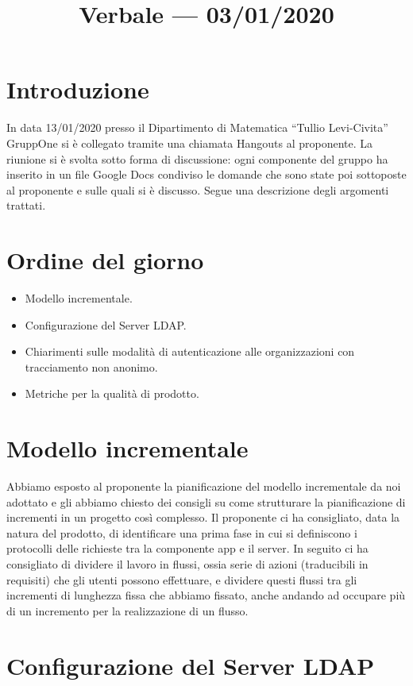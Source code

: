 \documentclass{article}
\title{Verbale --- 03/01/2020}
\begin{document}


\section{Introduzione}%
\label{sec:introduzione}

In data 13/01/2020 presso il Dipartimento di Matematica ``Tullio Levi-Civita'' GruppOne si è collegato tramite una chiamata Hangouts al proponente. La riunione si è svolta sotto forma di discussione: ogni componente del gruppo ha inserito in un file Google Docs condiviso le domande che sono state poi sottoposte al proponente e sulle quali si è discusso. Segue una descrizione degli argomenti trattati.

\section{Ordine del giorno}%
\label{sec:ordine_del_giorno}

\begin{itemize}
  \item Modello incrementale.
  \item Configurazione del Server LDAP\@.
  \item Chiarimenti sulle modalità di autenticazione alle organizzazioni con tracciamento non anonimo.
  \item Metriche per la qualità di prodotto.
\end{itemize}

\section{Modello incrementale}%
\label{sec:modello_incrementale}

Abbiamo esposto al proponente la pianificazione del modello incrementale da noi adottato e gli abbiamo chiesto dei consigli su come strutturare la pianificazione di incrementi in un progetto così complesso. Il proponente ci ha consigliato, data la natura del prodotto, di identificare una prima fase in cui si definiscono i protocolli delle richieste tra la componente app e il server. In seguito ci ha consigliato di dividere il lavoro in flussi, ossia serie di azioni (traducibili in requisiti) che gli utenti possono effettuare, e dividere questi flussi tra gli incrementi di lunghezza fissa che abbiamo fissato, anche andando ad occupare più di un incremento per la realizzazione di un flusso.

\section{Configurazione del Server LDAP}%
\label{sec:obiettivi_in_uscita_alla_RQ}
\end{document}
